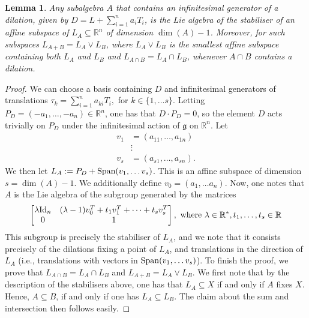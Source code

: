 \documentclass{article}
\newtheorem{lemma}[theorem]{Lemma}
\theoremstyle{definition}
\theoremstyle{remark}
\begin{document}
\begin{lemma}\label{lem: subalgebra of G is stabiliser}
    Any subalgebra $A$ that contains an infinitesimal generator of a dilation, given by $D= L + \sum_{i=1}^{n} a_iT_i $, is the Lie algebra of the stabiliser of an affine subspace of $L_A \subseteq \mathbb{R}^{n}$ of dimension $\dim(A) - 1$. Moreover, for such subspaces $L_{A + B} = L_{A} \vee L_{B}$, where $L_A \vee L_B$ is the smallest affine subspace containing both $L_A$ and $L_B$ and $L_{A\cap B} = L_A \cap L_B$, whenever $A\cap B$ contains a dilation.
\end{lemma}
\begin{proof}
We can choose a basis containing $D$ and infinitesimal generators of translations $\tau_{k} = \sum_{i=1}^{n} a_{ki} T_i,$ for $k\in \{1, \dots s\}$. Letting $P_D = (-a_1, \dots, -a_n) \in \mathbb{R}^n$, one has that $D\cdot P_D = 0$, so the element $D$ acts trivially on $P_D$ under the infinitesimal action of $\mathfrak{g}$ on $\mathbb{R}^{n}$. Let 
\begin{align*}
    v_1 &= (a_{11}, \dots, a_{1n})\\
     & \vdots\\
    v_s &= (a_{s1}, \dots, a_{sn}).
\end{align*}
We then let $L_{A}:= P_D + \textup{Span}(v_1, \dots v_s)$. This is an affine subspace of dimension $s = \dim(A) - 1$. We additionally define $v_0 = (a_1, \dots a_n)$.
Now, one notes that $A$ is the Lie algebra of the subgroup generated by the matrices 
\begin{align*}
\begin{bmatrix}
\lambda \textup{Id}_n & (\lambda -1)v_0^{T} + t_1 v_1^{T} + \dots + t_s v_s^{T}\\
 0 &  1 
 \end{bmatrix},
\textup{ where } \lambda \in \mathbb{R}^{*}, t_1, \dots, t_s \in \mathbb{R}
\end{align*}
This subgroup is precisely the stabiliser of $L_A$, and we note that it consists precisely of the dilations fixing a point of $L_A$, and translations in the direction of $L_A$ (i.e., translations with vectors in $\textup{Span}(v_1, \dots v_s)$). To finish the proof, we prove that $L_{A\cap B} = L_{A} \cap L_{B}$ and $L_{A+B} = L_A \vee L_B$. We first note that by the description of the stabilisers above, one has that $L_A \subseteq X$ if and only if $A$ fixes $X$. Hence, $A\subseteq B$, if and only if one has $L_A \subseteq L_B$. The claim about the sum and intersection then follows easily. 
\end{proof}
\end{document}
